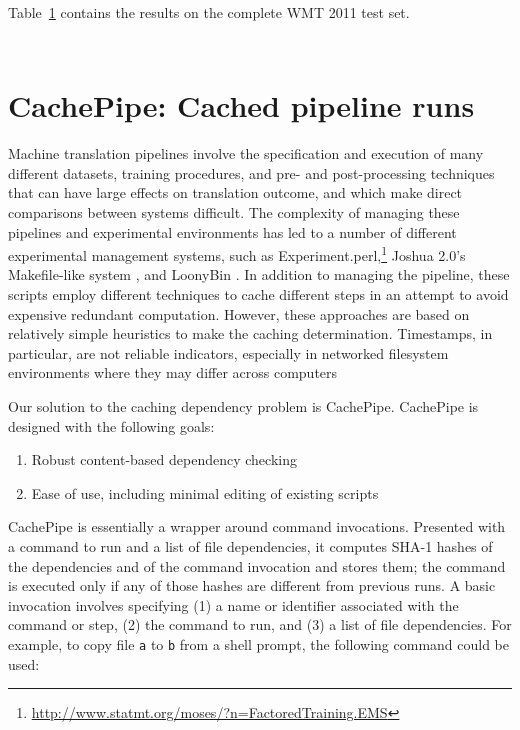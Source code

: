 \documentclass[11pt]{article}
\begin{document}
Table~\ref{table:results} contains the results on the complete WMT 2011 test set.

\begin{table}[t]
  \centering
  \begin{tabular}{cc}
  \end{tabular}
  \caption{}
  \label{table:results}
\end{table}

\section{CachePipe: Cached pipeline runs}

Machine translation pipelines involve the specification and execution
of many different datasets, training procedures, and pre- and
post-processing techniques that can have large effects on translation
outcome, and which make direct comparisons between systems difficult.
The complexity of managing these pipelines and experimental
environments has led to a number of different experimental management
systems, such as
Experiment.perl,\footnote{\url{http://www.statmt.org/moses/?n=FactoredTraining.EMS}}
Joshua 2.0's Makefile-like system \cite{li2010joshua}, and LoonyBin
\cite{clark2010loonybin}.  In addition to managing the pipeline, these
scripts employ different techniques to cache different steps in an
attempt to avoid expensive redundant computation.  However, these
approaches are based on relatively simple heuristics to make the
caching determination.  Timestamps, in particular, are not reliable
indicators, especially in networked filesystem environments where
they may differ across computers

Our solution to the caching dependency problem is CachePipe.
CachePipe is designed with the following goals:

\begin{enumerate}
\item Robust content-based dependency checking
\item Ease of use, including minimal editing of existing scripts
\end{enumerate}

\noindent CachePipe is essentially a wrapper around command
invocations.  Presented with a command to run
and a list of file dependencies, it computes SHA-1 hashes of the
dependencies and of the command invocation and stores them; the
command is executed only if any of those hashes are different from
previous runs.  A
basic invocation involves specifying (1) a name or identifier
associated with the command or step, (2) the command to run, and (3) a
list of file dependencies.  For example, to copy file \verb|a| to
\verb|b| from a shell prompt, the following command could be used:
\end{document}
